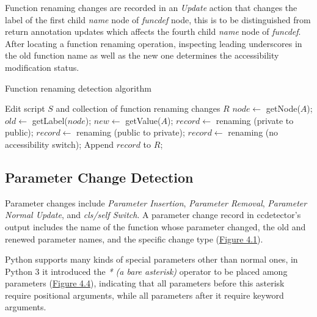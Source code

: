 Function renaming changes are recorded in an \textit{Update} action that changes the label of the first child \textit{name} node of \textit{funcdef} node, this is to be distinguished from return annotation updates which affects the fourth child \textit{name} node of \textit{funcdef}. After locating a function renaming operation, inspecting leading underscores in the old function name as well as the new one determines the accessibility modification status.

\begin{algorithm}
	\label{algo:function-renaming-detection}
	\caption{Function renaming detection algorithm}
	\SetAlgoLined
	\begin{algorithmic}[1]
		\REQUIRE Edit script $S$ and collection of function renaming changes $R$
			\STATE $node \gets$ getNode($A$);
				\STATE $old \gets$ getLabel($node$);
				\STATE $new \gets$ getValue($A$);
					\STATE $record \gets$ renaming (private to public);
					\STATE $record \gets$ renaming (public to private);
				\ELSE
					\STATE $record \gets$ renaming (no accessibility switch);
				\ENDIF
				\STATE Append $record$ to $R$;
			\ENDIF
		\ENDFOR
	\end{algorithmic}
\end{algorithm}

\subsection{Parameter Change Detection}
\label{subsec:param-change-detect}

Parameter changes include \textit{Parameter Insertion}, \textit{Parameter Removal}, \textit{Parameter Normal Update}, and \textit{cls/self Switch}. A parameter change record in ccdetector's output includes the name of the function whose parameter changed, the old and renewed parameter names, and the specific change type (\hyperref[fig:ccdetector-class-design]{Figure 4.1}).

Python supports many kinds of special parameters other than normal ones, in Python 3 it introduced the \textit{* (a bare asterisk)} operator to be placed among parameters (\hyperref[lst:asterisk-op]{Figure 4.4}), indicating that all parameters before this asterisk require positional arguments, while all parameters after it require keyword arguments.

